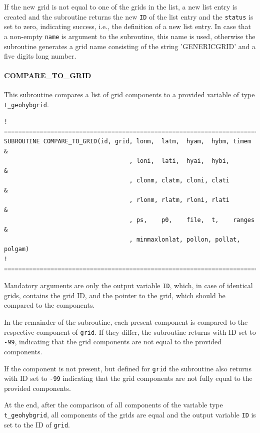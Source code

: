 \documentclass[11pt,twoside]{article}
\begin{document}
If the new grid is not equal to one of the grids in the list, a new list entry
is created and the subroutine returns the new \verb|ID| of the list entry
and the \verb|status| is set to zero, indicating success, i.e., the definition
of a new list entry. In case that a non-empty \verb|name| is  argument
to the subroutine, this name is used, otherwise the subroutine
generates a grid name consisting of the string 'GENERICGRID' and
a five digits long number.

\paragraph{COMPARE\_TO\_GRID\\ \label{CMP2GRID}}
This subroutine compares a list of grid components to a provided variable of
type \verb|t_geohybgrid|.

\begin{verbatim}
! ==================================================================================
SUBROUTINE COMPARE_TO_GRID(id, grid, lonm,  latm,  hyam,  hybm, timem  &
                                   , loni,  lati,  hyai,  hybi,        &
                                   , clonm, clatm, cloni, clati        & 
                                   , rlonm, rlatm, rloni, rlati        & 
                                   , ps,    p0,    file,  t,    ranges &
                                   , minmaxlonlat, pollon, pollat, polgam)
! ==================================================================================
\end{verbatim}

Mandatory arguments are only the output variable \verb|ID|, which, in case
of identical grids, contains the grid ID, and the pointer to the grid, which
should be compared to the components.

In the remainder of the subroutine, each present component is compared to 
the respective component of \verb|grid|. If they differ, the subroutine
returns with ID set to \verb|-99|, indicating that
the grid components are not equal to the provided components.

If the component is not present, but defined for \verb|grid| the subroutine
also returns  with ID set to \verb|-99|  indicating that
the grid components are not fully equal to the provided components.

At the end, after the comparison of all components of the variable type 
\verb|t_geohybgrid|, all components of the grids are equal and the
output variable \verb|ID| is set to the ID of \verb|grid|.
\end{document}
